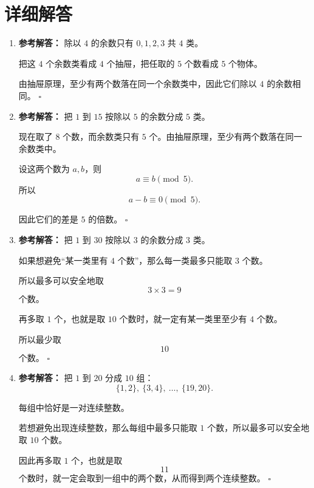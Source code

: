 \documentclass[11pt,a4paper,fontset=fandol]{ctexart}
\newenvironment{solution}{\par\noindent\textbf{参考解答：}}{\hfill$\square$\par}
\begin{document}
\newpage
\section{详细解答}

\begin{enumerate}
  \item \begin{solution}
  除以 $4$ 的余数只有 $0,1,2,3$ 共 $4$ 类。

  把这 $4$ 个余数类看成 $4$ 个抽屉，把任取的 $5$ 个数看成 $5$ 个物体。

  由抽屉原理，至少有两个数落在同一个余数类中，因此它们除以 $4$ 的余数相同。
  \end{solution}

  \item \begin{solution}
  把 $1$ 到 $15$ 按除以 $5$ 的余数分成 $5$ 类。

  现在取了 $8$ 个数，而余数类只有 $5$ 个。由抽屉原理，至少有两个数落在同一余数类中。

  设这两个数为 $a,b$，则
  \[
  a\equiv b\pmod 5.
  \]
  所以
  \[
  a-b\equiv 0\pmod 5.
  \]

  因此它们的差是 $5$ 的倍数。
  \end{solution}

  \item \begin{solution}
  把 $1$ 到 $30$ 按除以 $3$ 的余数分成 $3$ 类。

  如果想避免“某一类里有 $4$ 个数”，那么每一类最多只能取 $3$ 个数。

  所以最多可以安全地取
  \[
  3\times 3=9
  \]
  个数。

  再多取 $1$ 个，也就是取 $10$ 个数时，就一定有某一类里至少有 $4$ 个数。

  所以最少取
  \[
  10
  \]
  个数。
  \end{solution}

  \item \begin{solution}
  把 $1$ 到 $20$ 分成 $10$ 组：
  \[
  \{1,2\},\ \{3,4\},\ \ldots,\ \{19,20\}.
  \]

  每组中恰好是一对连续整数。

  若想避免出现连续整数，那么每组中最多只能取 $1$ 个数，所以最多可以安全地取 $10$ 个数。

  因此再多取 $1$ 个，也就是取
  \[
  11
  \]
  个数时，就一定会取到一组中的两个数，从而得到两个连续整数。
  \end{solution}


\end{enumerate}
\end{document}
